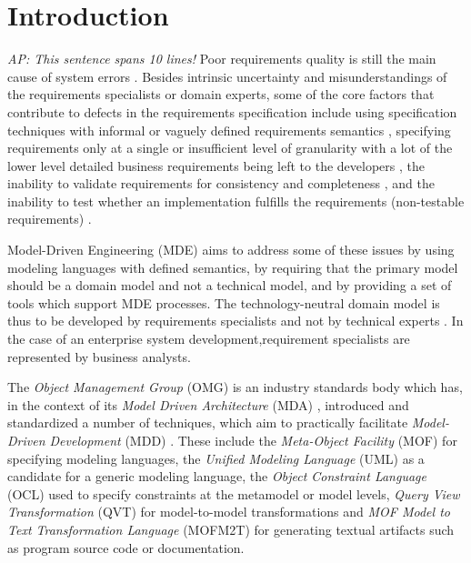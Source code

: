 \section{Introduction}

\emph{AP: This sentence spans 10 lines!}
Poor requirements quality is still the main cause of system errors \cite{heck_experiences_2008}. Besides intrinsic uncertainty and misunderstandings of the requirements specialists or domain experts, some of the core factors that contribute to defects in the requirements specification include using specification techniques with informal or vaguely defined requirements semantics \cite{ferguson_empirical_2006}, specifying requirements only at a single or insufficient level of granularity with a lot of the lower level detailed business requirements being left to the developers \cite{espana_evaluating_2009,getBetterReference}, the inability to validate requirements for consistency and completeness \cite{somebodyPleaseFindASuitableReference}, and the inability to test whether an implementation fulfills the requirements (non-testable requirements) \cite{bashardoust-tajali_extracting_2008}.

Model-Driven Engineering (MDE)  \cite{schmidt_model_2006} aims to address some of these issues by using modeling languages with defined semantics, by requiring that the primary model should be a domain model and not a technical model\cite{asnina_computation_2010}, and by providing a set of tools which support MDE processes. The technology-neutral domain model is thus to be developed by requirements specialists and not by technical experts \cite{asnina_computation_2010}. In the case of an enterprise system development,requirement specialists are represented by business analysts.

The {\em Object Management Group} (OMG) \cite{} is an industry standards body which has, in the context of its {\em Model Driven Architecture} (MDA) \cite{siegel_developing_2001}, introduced and standardized a number of techniques, which aim to practically facilitate {\em Model-Driven Development} (MDD) \cite{}. These include the {\em Meta-Object Facility} (MOF)  \cite{} for specifying modeling languages, the {\em Unified Modeling Language} (UML) \cite{} as a candidate for a generic modeling language, the {\em Object Constraint Language} (OCL) used to specify constraints at the metamodel or model levels, {\em Query View Transformation} (QVT) for model-to-model transformations and {\em MOF Model to Text Transformation Language} (MOFM2T) for generating textual artifacts such as program source code or documentation. 

